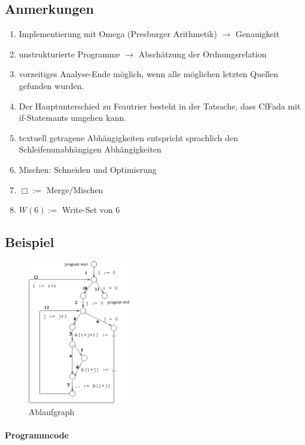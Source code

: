 \subsection{Anmerkungen}
\begin{enumerate}
  \item Implementierung mit Omega (Presburger Arithmetik) \( \rightarrow \) Genauigkeit
  \item unstrukturierte Programme \( \rightarrow \) Abschätzung der Ordnungsrelation
  \item vorzeitiges Analyse-Ende möglich, wenn alle möglichen letzten Quellen gefunden wurden.
  \item Der Hauptunterschied zu Feautrier besteht in der Tatsache, dass CfFada mit if-Statemants umgehen kann.
  \item textuell getragene Abhängigkeiten entspricht sprachlich den Schleifenunabhängigen Abhängigkeiten
  \item Mischen: Schneiden und Optimierung
  \item \( \Box := \) Merge/Mischen
  \item \( W(6) := \) Write-Set von 6
\end{enumerate}


\subsection{Beispiel}
\begin{figure}
    \begin{flushright}
        \includegraphics[width=0.4\textwidth]{images/cffada.png}
        \caption{Ablaufgraph}
    \end{flushright}
\end{figure}

\paragraph{Programmcode}~\\
\begin{procedure}[H]
\SetAlgoLined
{}
\end{procedure}

